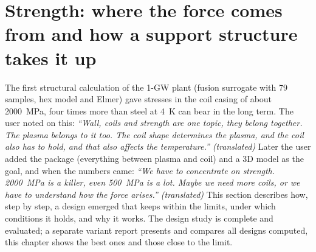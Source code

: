 \section{Strength: where the force comes from and how a support structure takes it up}\label{sec:festigkeit}

The first structural calculation of the 1-GW plant (fusion surrogate with 79 samples, hex model and Elmer) gave stresses in the coil casing of
about \SI{2000}{MPa}, four times more than steel at \SI{4}{K} can bear in the long term. The user noted on this:
\emph{“Wall, coils and strength are one topic, they belong together. The plasma belongs to it too. The coil shape
determines the plasma, and the coil also has to hold, and that also affects the temperature.” (translated)} Later the user
added the package (everything between plasma and coil) and a 3D model as the goal, and when the numbers came:
\emph{“We have to concentrate on strength. 2000~MPa is a killer, even 500~MPa is a lot. Maybe we need more coils, or we
have to understand how the force arises.” (translated)} This section describes how, step by step, a design emerged
that keeps within the limits, under which conditions it holds, and why it works. The design study is complete and
evaluated; a separate variant report presents and compares all designs computed, this chapter shows the best ones and
those close to the limit.

